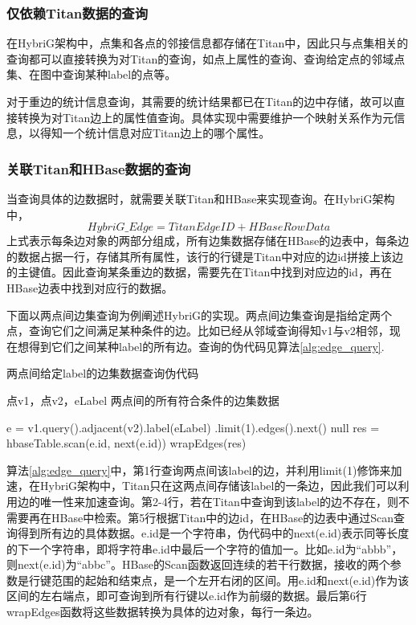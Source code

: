 \subsubsection{仅依赖Titan数据的查询}
在HybriG架构中，点集和各点的邻接信息都存储在Titan中，因此只与点集相关的查询都可以直接转换为对Titan的查询，如点上属性的查询、查询给定点的邻域点集、在图中查询某种label的点等。

对于重边的统计信息查询，其需要的统计结果都已在Titan的边中存储，故可以直接转换为对Titan边上的属性值查询。具体实现中需要维护一个映射关系作为元信息，以得知一个统计信息对应Titan边上的哪个属性。
\subsubsection{关联Titan和HBase数据的查询}
当查询具体的边数据时，就需要关联Titan和HBase来实现查询。在HybriG架构中，
$$HybriG\_Edge = TitanEdgeID + HBaseRowData$$
上式表示每条边对象的两部分组成，所有边集数据存储在HBase的边表中，每条边的数据占据一行，存储其所有属性，该行的行键是Titan中对应的边id拼接上该边的主键值。因此查询某条重边的数据，需要先在Titan中找到对应边的id，再在HBase边表中找到对应行的数据。

下面以两点间边集查询为例阐述HybriG的实现。两点间边集查询是指给定两个点，查询它们之间满足某种条件的边。比如已经从邻域查询得知v1与v2相邻，现在想得到它们之间某种label的所有边。查询的伪代码见算法\ref{alg:edge_query}.
\begin{algorithm}
\caption{两点间给定label的边集数据查询伪代码}
\label{alg:edge_query}
\begin{algorithmic}[1] %
\REQUIRE 点v1，点v2，eLabel
\ENSURE 两点间的所有符合条件的边集数据

\STATE e = v1.query().adjacent(v2).label(eLabel)
.limit(1).edges().next()
\RETURN null
\ENDIF
\STATE res = hbaseTable.scan(e.id, next(e.id))
\RETURN wrapEdges(res)
\end{algorithmic}
\end{algorithm}

算法\ref{alg:edge_query}中，第1行查询两点间该label的边，并利用limit(1)修饰来加速，在HybriG架构中，Titan只在这两点间存储该label的一条边，因此我们可以利用边的唯一性来加速查询。第2-4行，若在Titan中查询到该label的边不存在，则不需要再在HBase中检索。第5行根据Titan中的边id，在HBase的边表中通过Scan查询得到所有边的具体数据。e.id是一个字符串，伪代码中的next(e.id)表示同等长度的下一个字符串，即将字符串e.id中最后一个字符的值加一。比如e.id为“abbb”，则next(e.id)为“abbc”。HBase的Scan函数返回连续的若干行数据，接收的两个参数是行键范围的起始和结束点，是一个左开右闭的区间。用e.id和next(e.id)作为该区间的左右端点，即可查询到所有行键以e.id作为前缀的数据。最后第6行wrapEdges函数将这些数据转换为具体的边对象，每行一条边。

